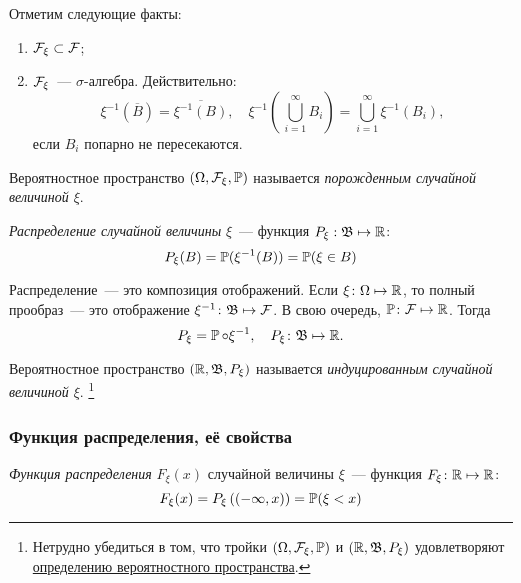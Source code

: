 Отметим следующие факты:
\begin{enumerate}
    \item $\mathcal{F}_\xi \subset \mathcal{F}$;
    \item $\mathcal{F}_\xi$~--- ${\sigma \text{-алгебра}}$. Действительно:
    \begin{equation*}
        \xi^{-1}(\overline{B}) = \overline{\xi^{-1}(B)}, \quad
        \xi^{-1}\left(\, \bigcup\limits_{i=1}^{\infty}B_i \right) = \bigcup\limits_{i=1}^\infty \xi^{-1}(B_i),
    \end{equation*}
   если $B_i$ попарно не пересекаются.
\end{enumerate}

\begin{defn}
    Вероятностное пространство $(\Omega,\mathcal{F}_\xi,\operatorname{\mathbb{P}})$ называется \textit{порожденным случайной величиной $\xi$}.
\end{defn}

\begin{defn}
    \textit{Распределение случайной величины} $\xi$~--- функция ${P_\xi: \mathfrak{B} \mapsto \mathbb{R}}$:
    \begin{equation*}
        P_\xi(B) = \operatorname{\mathbb{P}}(\xi^{-1}(B)) = \operatorname{\mathbb{P}}(\xi \in B)
    \end{equation*}
\end{defn}

\begin{rmrk}
    Распределение~--- это композиция отображений. Если ${\xi\colon \Omega \mapsto \mathbb{R}}$, то полный прообраз~--- это отображение ${\xi^{-1}\colon \mathfrak{B} \mapsto \mathcal{F}}$. В свою очередь, ${\operatorname{\mathbb{P}}\colon \mathcal{F} \mapsto \mathbb{R}}$. Тогда
    \begin{equation*}
        P_{\xi} = \operatorname{\mathbb{P}} \circ \xi^{-1}, \quad P_{\xi}\colon \mathfrak{B} \mapsto \mathbb{R}.
    \end{equation*}
\end{rmrk}

\hypertarget{induced_prob_space}{}
\begin{defn}
    Вероятностное пространство $(\mathbb{R}, \mathfrak{B}, P_\xi)$ называется \textit{индуцированным случайной величиной $\xi$}. 
        \footnote{Нетрудно убедиться в том, что тройки $\left(\Omega, \mathcal{F}_{\xi}, \operatorname{\mathbb{P}}\right)$ и $\left(\mathbb{R}, \mathfrak{B}, P_{\xi}\right)$ удовлетворяют \hyperlink{prob_space}{определению вероятностного пространства}.}
\end{defn}

\subsubsection{Функция распределения, её свойства}
\begin{defn}
    \textit{Функция распределения} $F_\xi (x)$ случайной величины $\xi$~--- функция $F_\xi \colon \mathbb{R} \mapsto \mathbb{R}$:
    \begin{equation*}
        F_{\xi}(x) = P_{\xi}\left((-\infty, x)\right) = \operatorname{\mathbb{P}}(\xi<x)
    \end{equation*}
\end{defn}

